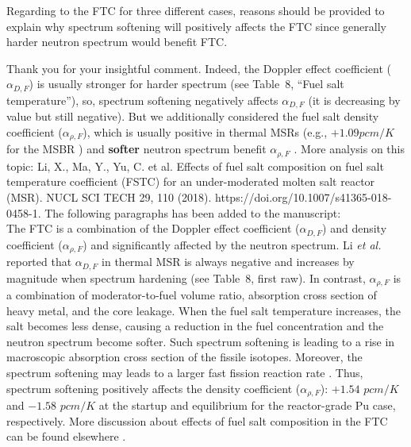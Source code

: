 \documentclass[answers,11pt]{exam}
\begin{document}
\begin{questions}
        \question Regarding to the FTC for three different cases, reasons should be provided to explain why spectrum softening will positively affects the FTC since generally harder neutron spectrum would benefit FTC.
        \begin{solution}
                Thank you for your insightful comment.  Indeed, the Doppler 
                effect coefficient ($\alpha_{D,F}$) is usually stronger for 
                harder spectrum (see Table~8, ``Fuel salt temperature''), so, 
                spectrum softening negatively affects $\alpha_{D,F}$ (it is 
                decreasing by value but still negative). But we additionally 
                considered the fuel salt density coefficient 
                ($\alpha_{\rho,F}$), which is usually positive in thermal MSRs 
                (e.g., $+1.09pcm/K$ for the \gls{MSBR}           
                \cite{robertson_conceptual_1971}) and \textbf{softer} neutron 
                spectrum benefit $\alpha_{\rho,F}$ \cite{li_effects_2018-1, 
                rykhlevskii2019modeling}. More analysis on this topic:
            Li, X., Ma, Y., Yu, C. et al. Effects of fuel salt composition on 
            fuel salt temperature coefficient (FSTC) for an under-moderated 
            molten salt reactor (MSR). NUCL SCI TECH 29, 110 (2018). 
            https://doi.org/10.1007/s41365-018-0458-1.     
	            The following paragraphs has been added to the manuscript:\\

	            The \gls{FTC} is a combination of the Doppler effect 
	            coefficient ($\alpha_{D,F}$) and density coefficient 
	            ($\alpha_{\rho,F}$) and significantly affected by the neutron 
	            spectrum. Li \emph{et al.} reported that 	            
	            $\alpha_{D,F}$ in thermal \gls{MSR} is always negative and 
	            increases by magnitude when spectrum hardening (see Table~8, 
	            first raw). In contrast, $\alpha_{\rho,F}$ is a combination of 
	            moderator-to-fuel volume ratio, absorption cross section of 
	            heavy metal, and the core leakage. When the fuel salt 
	            temperature increases, the salt becomes less dense, 
	            causing a reduction in the fuel concentration and the neutron 
	            spectrum become softer. Such spectrum softening is leading to 
	            a rise in macroscopic absorption cross section of the fissile 
	            isotopes. Moreover, the spectrum softening may leads to 
	            a larger fast fission reaction rate \cite{li_effects_2018-1}. 
	            Thus, spectrum softening positively affects the density 
	            coefficient ($\alpha_{\rho,F}$): $+1.54$ $pcm/K$ and $-1.58$ 
	            $pcm/K$ at the startup and equilibrium for the 
	            reactor-grade Pu case, respectively. More discussion about 
	            effects of fuel salt composition in the \gls{FTC} can be found 
	            elsewhere 
	            \cite{li_effects_2018-1}.
        \end{solution}


\end{questions}
\end{document}
